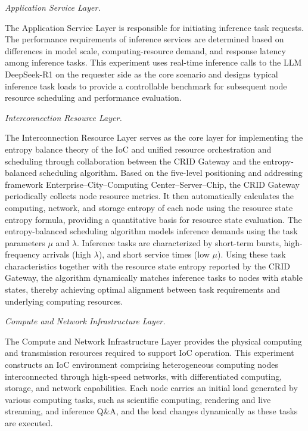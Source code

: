 \documentclass{ccjnl}
\begin{document}
\par
{}
\noindent\textit{Application Service Layer.}\par

The Application Service Layer is responsible for initiating inference task requests. The performance requirements of inference services are determined based on differences in model scale, computing-resource demand, and response latency among inference tasks. This experiment uses real-time inference calls to the LLM DeepSeek-R1 on the requester side as the core scenario and designs typical inference task loads to provide a controllable benchmark for subsequent node resource scheduling and performance evaluation.

\par
{}
\noindent\textit{Interconnection Resource Layer.}\par

The Interconnection Resource Layer serves as the core layer for implementing the entropy balance theory of the IoC and unified resource orchestration and scheduling through collaboration between the CRID Gateway and the entropy-balanced scheduling algorithm. Based on the five-level positioning and addressing framework Enterprise--City--Computing Center--Server--Chip, the CRID Gateway periodically collects node resource metrics. It then automatically calculates the computing, network, and storage entropy of each node using the resource state entropy formula, providing a quantitative basis for resource state evaluation. The entropy-balanced scheduling algorithm models inference demands using the task parameters $\mu$ and $\lambda$. Inference tasks are characterized by short-term bursts, high-frequency arrivals (high $\lambda$), and short service times (low $\mu$). Using these task characteristics together with the resource state entropy reported by the CRID Gateway, the algorithm dynamically matches inference tasks to nodes with stable states, thereby achieving optimal alignment between task requirements and underlying computing resources.

\par
{}
\noindent\textit{Compute and Network Infrastructure Layer.}\par

The Compute and Network Infrastructure Layer provides the physical computing and transmission resources required to support IoC operation. This experiment constructs an IoC environment comprising heterogeneous computing nodes interconnected through high-speed networks, with differentiated computing, storage, and network capabilities. Each node carries an initial load generated by various computing tasks, such as scientific computing, rendering and live streaming, and inference Q\&A, and the load changes dynamically as these tasks are executed.
\end{document}
